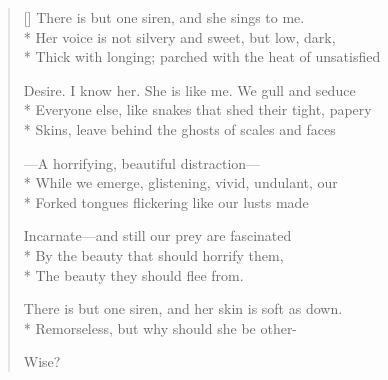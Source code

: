 \label{ch:lear_bk}
\settowidth{\versewidth}{Everyone else, like snakes that shed their tight, papery}
\begin{verse}[\versewidth]
 There is but one siren, and she sings to me.\\*
Her voice is not silvery and sweet, but low, dark,\\*
Thick with longing; parched with the heat of unsatisfied

Desire. I know her. She is like me. We gull and seduce\\*
Everyone else, like snakes that shed their tight, papery\\*
Skins, leave behind the ghosts of scales and faces

---A horrifying, beautiful distraction---\\*
While we emerge, glistening, vivid, undulant, our\\*
Forked tongues flickering like our lusts made

Incarnate---and still our prey are fascinated\\*
By the beauty that should horrify them,\\*
The beauty they should flee from.

There is but one siren, and her skin is soft as down.\\*
Remorseless, but why should she be other-

Wise?
\end{verse}
